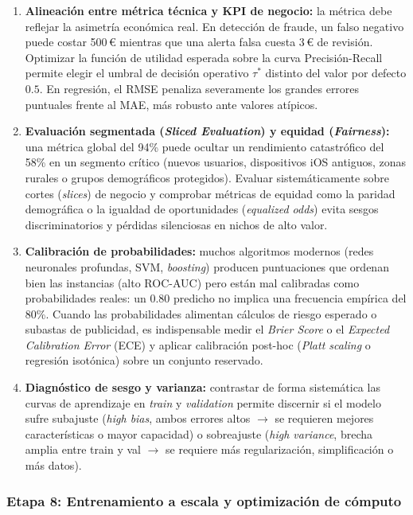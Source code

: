 \begin{enumerate}
  \item \textbf{Alineación entre métrica técnica y KPI de negocio:} la métrica debe reflejar la asimetría económica real. En detección de fraude, un falso negativo puede costar 500\,€ mientras que una alerta falsa cuesta 3\,€ de revisión. Optimizar la función de utilidad esperada sobre la curva Precisión-Recall permite elegir el umbral de decisión operativo $\tau^*$ distinto del valor por defecto $0.5$. En regresión, el RMSE penaliza severamente los grandes errores puntuales frente al MAE, más robusto ante valores atípicos.
  \item \textbf{Evaluación segmentada (\textit{Sliced Evaluation}) y equidad (\textit{Fairness}):} una métrica global del 94\% puede ocultar un rendimiento catastrófico del 58\% en un segmento crítico (nuevos usuarios, dispositivos iOS antiguos, zonas rurales o grupos demográficos protegidos). Evaluar sistemáticamente sobre cortes (\textit{slices}) de negocio y comprobar métricas de equidad como la paridad demográfica o la igualdad de oportunidades (\textit{equalized odds}) evita sesgos discriminatorios y pérdidas silenciosas en nichos de alto valor.
  \item \textbf{Calibración de probabilidades:} muchos algoritmos modernos (redes neuronales profundas, SVM, \textit{boosting}) producen puntuaciones que ordenan bien las instancias (alto ROC-AUC) pero están mal calibradas como probabilidades reales: un 0.80 predicho no implica una frecuencia empírica del 80\%. Cuando las probabilidades alimentan cálculos de riesgo esperado o subastas de publicidad, es indispensable medir el \textit{Brier Score} o el \textit{Expected Calibration Error} (ECE) y aplicar calibración post-hoc (\textit{Platt scaling} o regresión isotónica) sobre un conjunto reservado.
  \item \textbf{Diagnóstico de sesgo y varianza:} contrastar de forma sistemática las curvas de aprendizaje en \textit{train} y \textit{validation} permite discernir si el modelo sufre subajuste (\textit{high bias}, ambos errores altos $\rightarrow$ se requieren mejores características o mayor capacidad) o sobreajuste (\textit{high variance}, brecha amplia entre train y val $\rightarrow$ se requiere más regularización, simplificación o más datos).
\end{enumerate}

\subsubsection{Etapa 8: Entrenamiento a escala y optimización de cómputo}

